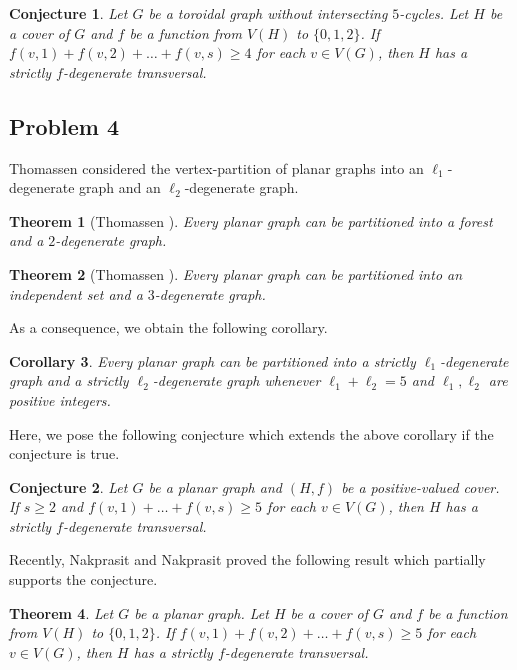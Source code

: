 \documentclass{article}
\newtheorem{theorem}{Theorem}[section]
\newtheorem{corollary}[theorem]{Corollary}
\newtheorem{conjecture}{Conjecture}
\theoremstyle{definition}
\begin{document}
\begin{conjecture}
Let $G$ be a toroidal graph without intersecting $5$-cycles. Let $H$ be a cover of $G$ and $f$ be a function from $V(H)$ to $\{0, 1, 2\}$. If $f(v, 1) + f(v, 2) + \dots + f(v, s) \geq 4$ for each $v \in V(G)$, then $H$ has a strictly $f$-degenerate transversal. 
\end{conjecture}

\subsection{Problem 4}
Thomassen considered the vertex-partition of planar graphs into an $\ell_{1}$-degenerate graph and an $\ell_{2}$-degenerate graph. 
\begin{theorem}[Thomassen \cite{MR1358992}]
Every planar graph can be partitioned into a forest and a $2$-degenerate graph.
\end{theorem}

\begin{theorem}[Thomassen \cite{MR1866722}]
Every planar graph can be partitioned into an independent set and a $3$-degenerate graph.
\end{theorem}

As a consequence, we obtain the following corollary. 
\begin{corollary}
Every planar graph can be partitioned into a strictly $\ell_{1}$-degenerate graph and a strictly $\ell_{2}$-degenerate graph whenever $\ell_{1} + \ell_{2} = 5$ and $\ell_{1}, \ell_{2}$ are positive integers. 
\end{corollary}

Here, we pose the following conjecture which extends the above corollary if the conjecture is true. 
\begin{conjecture}
Let $G$ be a planar graph and $(H, f)$ be a positive-valued cover. If $s \geq 2$ and $f(v, 1) + \dots + f(v, s) \geq 5$ for each $v \in V(G)$, then $H$ has a strictly $f$-degenerate transversal. 
\end{conjecture}

Recently, Nakprasit and Nakprasit \cite{MR4114324} proved the following result which partially supports the conjecture. 
\begin{theorem}
Let $G$ be a planar graph. Let $H$ be a cover of $G$ and $f$ be a function from $V(H)$ to $\{0, 1, 2\}$. If $f(v, 1) + f(v, 2) + \dots + f(v, s) \geq 5$ for each $v \in V(G)$, then $H$ has a strictly $f$-degenerate transversal. 
\end{theorem}
\end{document}
